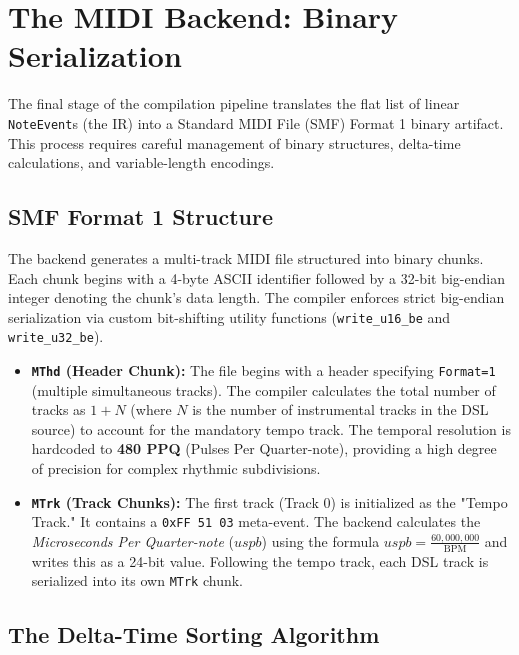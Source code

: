 \section{The MIDI Backend: Binary Serialization}\label{sec:implementation-backend}

The final stage of the compilation pipeline translates the flat list of linear \texttt{NoteEvent}s (the IR)
into a Standard MIDI File (SMF) Format 1 binary artifact.
This process requires careful management of binary structures, delta-time calculations, and variable-length encodings.

\subsection{SMF Format 1 Structure}

The backend generates a multi-track MIDI file structured into binary chunks.
Each chunk begins with a 4-byte ASCII identifier followed by a 32-bit big-endian integer denoting the chunk's
data length.
The compiler enforces strict big-endian serialization via custom bit-shifting utility functions
(\texttt{write\_u16\_be} and \texttt{write\_u32\_be}).

\begin{itemize}
  \item \textbf{\texttt{MThd} (Header Chunk):} The file begins with a header specifying \texttt{Format=1}
    (multiple simultaneous tracks). The compiler calculates the total number of tracks as $1 + N$ (where $N$
    is the number of instrumental tracks in the DSL source) to account for the mandatory tempo track. The
    temporal resolution is hardcoded to \textbf{480 PPQ} (Pulses Per Quarter-note), providing a high degree
    of precision for complex rhythmic subdivisions.
  \item \textbf{\texttt{MTrk} (Track Chunks):} The first track (Track 0) is initialized as the "Tempo Track."
    It contains a \texttt{0xFF 51 03} meta-event. The backend calculates the \textit{Microseconds Per
    Quarter-note} ($uspb$) using the formula $uspb = \frac{60,000,000}{\mathrm{BPM}}$ and writes this as a
    24-bit value. Following the tempo track, each DSL track is serialized into its own \texttt{MTrk} chunk.
\end{itemize}

\subsection{The Delta-Time Sorting Algorithm}


